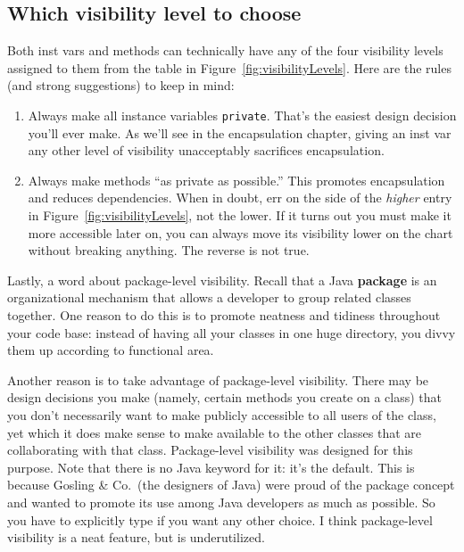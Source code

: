 \subsection{Which visibility level to choose}

Both inst vars and methods can technically have any of the four visibility
levels assigned to them from the table in Figure~\ref{fig:visibilityLevels}.
Here are the rules (and strong suggestions) to keep in mind:

\begin{enumerate}
\itemsep.1em
\item Always make all instance variables \texttt{private}. That's the easiest
design decision you'll ever make. As we'll see in the encapsulation chapter,
giving an inst var any other level of visibility unacceptably sacrifices
encapsulation.
\item Always make methods ``as private as possible.'' This promotes
encapsulation and reduces dependencies. When in doubt, err on the side of the
\textit{higher} entry in Figure~\ref{fig:visibilityLevels}, not the lower. If
it turns out you must make it more accessible later on, you can always move
its visibility lower on the chart without breaking anything. The reverse is
not true.
\end{enumerate}

Lastly, a word about package-level visibility. Recall that a Java
\textbf{package} is an organizational mechanism that allows a developer to
group related classes together. One reason to do this is to promote neatness
and tidiness throughout your code base: instead of having all your classes in
one huge directory, you divvy them up according to functional area. 

Another reason is to take advantage of package-level visibility. There may be
design decisions you make (namely, certain methods you create on a class) that
you don't necessarily want to make publicly accessible to all users of the
class, yet which it does make sense to make available to the other classes
that are collaborating with that class. Package-level visibility was designed
for this purpose. Note that there is no Java keyword for it: it's the default.
This is because Gosling \& Co.~(the designers of Java) were proud of the
package concept and wanted to promote its use among Java developers as much as
possible. So you have to explicitly type if you want any other choice. I think
package-level visibility is a neat feature, but is underutilized.

